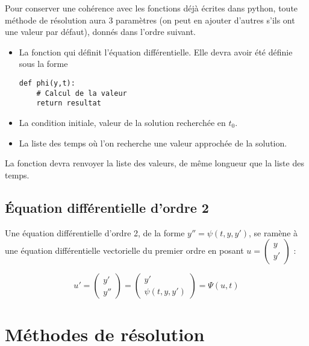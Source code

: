 Pour conserver une cohérence avec les fonctions déjà écrites dans python, toute méthode de résolution aura 3 paramètres (on peut en ajouter d'autres s'ils ont une valeur par défaut), donnés dans l'ordre suivant.
\begin{itemize}
  \item La fonction  qui définit l'équation différentielle. Elle devra avoir été définie sous la forme
  \begin{lstlisting}
def phi(y,t):
    # Calcul de la valeur
    return resultat
\end{lstlisting}
\item La condition initiale, valeur de la solution recherchée en $t_0$.
\item La liste des temps où l'on recherche une valeur approchée de la solution.
\end{itemize}
La fonction devra renvoyer la liste des valeurs, de même longueur que la liste des temps.
\subsection{Équation différentielle d'ordre 2}
Une équation différentielle d'ordre 2, de la forme $y'' = \psi(t,y,y')$, se ramène à une équation différentielle vectorielle du premier ordre en posant $u = \begin{pmatrix} y\\ y'\end{pmatrix}$ : 

\[ u' = \begin{pmatrix} y'\\ y''\end{pmatrix}
=\begin{pmatrix} y'\\ \psi(t,y,y')\end{pmatrix}
=\Psi(u,t) \]
\newpage
\section{Méthodes de résolution}
